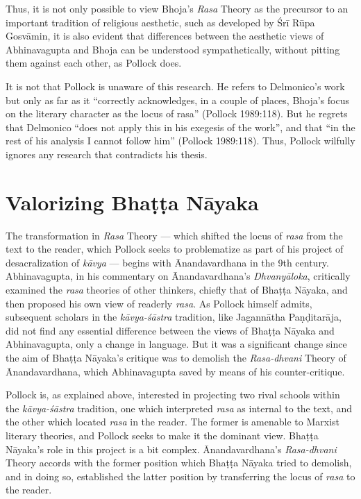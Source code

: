 Thus, it is not only possible to view Bhoja's \textsl{Rasa}
 Theory as the precursor to an important tradition of religious aesthetic, such as developed by Śrī Rūpa Gosvāmin, it is also evident that differences between the aesthetic views of Abhinavagupta and Bhoja can be understood sympathetically, without pitting them against each other, as Pollock does. 
 
It is not that Pollock is unaware of this research. He refers to Delmonico's work but only as far as it ``correctly acknowledges, in a couple of places, Bhoja's focus on the literary character as the locus of rasa'' (Pollock 1989:118). But he regrets that Delmonico ``does not apply this in his exegesis of the work'', and that ``in the rest of his analysis I cannot follow him'' (Pollock 1989:118). Thus, Pollock wilfully ignores any research that contradicts his thesis.

\section*{Valorizing Bhaṭṭa Nāyaka}

The transformation in \textsl{Rasa} Theory --- which shifted the locus of \textsl{rasa} from the text to the reader, which Pollock seeks to problematize as part of his project of desacralization of \textsl{kāvya} --- begins with Ānandavardhana in the 9th century. Abhinavagupta, in his commentary on Ānandavardhana's \textsl{Dhvanyāloka}, critically examined the \textsl{rasa} theories of other thinkers, chiefly that of Bhaṭṭa Nāyaka, and then proposed his own view of readerly \textsl{rasa}. As Pollock himself admits, subsequent scholars in the \textsl{kāvya-śāstra} tradition, like Jagannātha Paṇḍitarāja, did not find any essential difference between the views of Bhaṭṭa Nāyaka and Abhinavagupta, only a change in language. But it was a significant change since the aim of Bhaṭṭa Nāyaka's critique was to demolish the \textsl{Rasa-dhvani} Theory of Ānandavardhana, which Abhinavagupta saved by means of his counter-critique. 

Pollock is, as explained above, interested in projecting two rival schools within the \textsl{kāvya-śāstra} tradition, one which interpreted \textsl{rasa} as internal to the text, and the other which located \textsl{rasa} in the reader. The former is amenable to Marxist literary theories, and Pollock seeks to make it the dominant view. Bhaṭṭa Nāyaka's role in this project is a bit complex. Ānandavardhana's \textsl{Rasa-dhvani} Theory accords with the former position which Bhaṭṭa Nāyaka tried to demolish, and in doing so, established the latter position by transferring the locus of \textsl{rasa} to the reader. 

